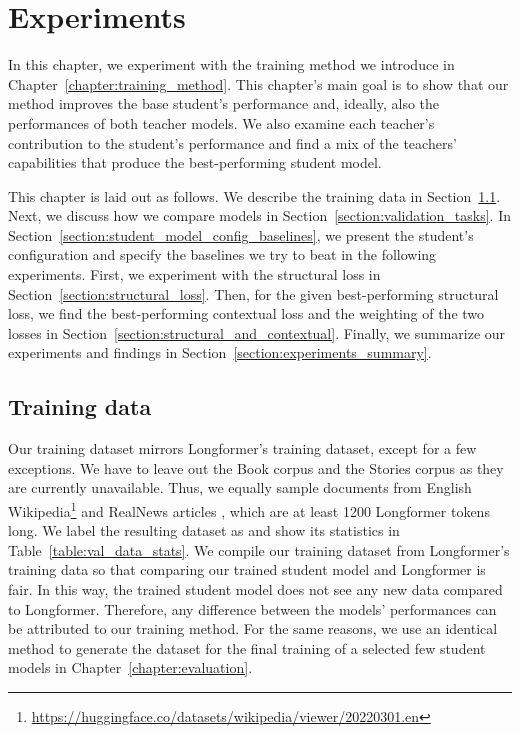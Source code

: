\chapter{Experiments}\label{chapter:experiments}

In this chapter, we experiment with the training method we introduce in
Chapter~\ref{chapter:training_method}. This chapter's main goal is to show that our method improves the base student's performance and, ideally, also the performances of both teacher models. We also examine
each teacher's contribution to the student's performance and find a mix of the teachers' capabilities that produce the best-performing student model.

This chapter is laid out as follows. We describe the training data in
Section~\ref{section:val_training_data}. Next, we discuss how we compare models
in Section~\ref{section:validation_tasks}. In Section~\ref{section:student_model_config_baselines}, we present the student's
configuration and specify the baselines we try to beat in the following experiments. First, we experiment with the structural loss in Section~\ref{section:structural_loss}. Then, for the given best-performing structural loss, we find the best-performing contextual loss and
the weighting of the two losses in Section~\ref{section:structural_and_contextual}.
Finally, we summarize our experiments and findings in
Section~\ref{section:experiments_summary}.

\section{Training data}\label{section:val_training_data}

Our training dataset mirrors Longformer's training dataset, except for a few
exceptions. We have to leave out the Book corpus \citep{zhu2015aligning} and the Stories
corpus \citep{trinh2018simple} as they are currently unavailable. Thus, we
equally sample documents from English Wikipedia\footnote{\url{https://huggingface.co/datasets/wikipedia/viewer/20220301.en}} and RealNews articles
\citep{zellers2019defending}, which are at least 1200 Longformer tokens long.
We label the resulting dataset as  and show its statistics in
Table~\ref{table:val_data_stats}. We compile our training dataset from Longformer's training data so that comparing our trained student model and Longformer is fair. In this way, the trained student model does
not see any new data compared to Longformer. Therefore, any difference
between the models' performances can be attributed to our training method. For
the same reasons, we use an identical method to generate the dataset
 for the final training of a selected few student models in
Chapter~\ref{chapter:evaluation}.

